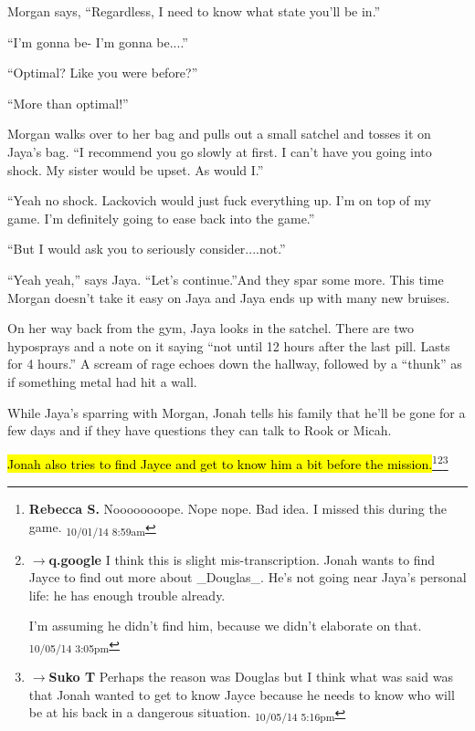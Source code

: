 Morgan says, ``Regardless, I need to know what state you'll be in.''

``I'm gonna be- I'm gonna be....''

``Optimal?  Like you were before?''

``More than optimal!''

Morgan walks over to her bag and pulls out a small satchel and tosses it on Jaya's bag.  ``I recommend you go slowly at first.  I can't have you going into shock.  My sister would be upset.  As would I.''

``Yeah no shock.  Lackovich would just fuck everything up.  I'm on top of my game.  I'm definitely going to ease back into the game.''

``But I would ask you to seriously consider....not.''

``Yeah yeah,'' says Jaya.  ``Let's continue.''And they spar some more.  This time Morgan doesn't take it easy on Jaya and Jaya ends up with many new bruises.



On her way back from the gym, Jaya looks in the satchel. There are two hyposprays and a note on it saying ``not until 12 hours after the last pill.  Lasts for 4 hours.''   A scream of rage echoes down the hallway, followed by a ``thunk'' as if something metal had hit a wall.



While Jaya's sparring with Morgan, Jonah tells his family that he'll be gone for a few days and if they have questions they can talk to Rook or Micah.



\hl{Jonah also tries to find Jayce and get to know him a bit before the mission.}\footnote{\textbf{Rebecca S. }Noooooooope. Nope nope. Bad idea.  I missed this during the game. \textsubscript{10/01/14 8:59am}}\footnote{$\rightarrow$\textbf{q.google }I think this is slight mis-transcription.  Jonah wants to find Jayce to find out more about \_Douglas\_.  He's not going near Jaya's personal life: he has enough trouble already.

I'm assuming he didn't find him, because we didn't elaborate on that. \textsubscript{10/05/14 3:05pm}}\footnote{$\rightarrow$\textbf{Suko T }Perhaps the reason was Douglas but I think what was said was that Jonah wanted to get to know Jayce because he needs to know who will be at his back in a dangerous situation. \textsubscript{10/05/14 5:16pm}}





